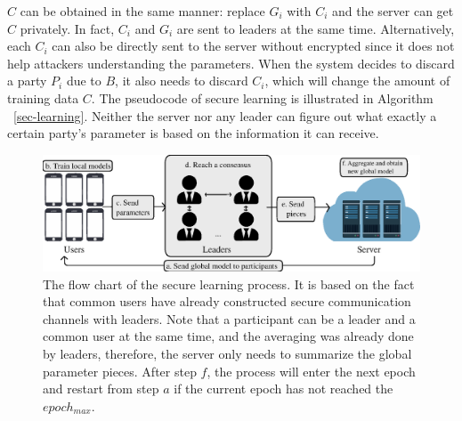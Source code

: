 $C$ can be obtained in the same manner: replace $G_i$ with $C_i$ and the server can get $C$ privately. In fact, $C_i$ and $G_i$ are sent to leaders at the same time. Alternatively, each $C_i$ can also be directly sent to the server without encrypted since it does not help attackers understanding the parameters. When the system decides to discard a party $P_i$ due to $B$, it also needs to discard $C_i$, which will change the amount of training data $C$. The pseudocode of secure learning is illustrated in Algorithm ~\ref{sec-learning}. Neither the server nor any leader can figure out what exactly a certain party's parameter is based on the information it can receive. 

\begin{figure}[!ht]
    \centering
    \includegraphics[width=1.8\columnwidth]{img/alg.eps}
    \caption{The flow chart of the secure learning process. It is based on the fact that common users have already constructed secure communication channels with leaders. Note that a participant can be a leader and a common user at the same time, and the averaging was already done by leaders, therefore, the server only needs to summarize the global parameter pieces. After step $f$, the process will enter the next epoch and restart from step $a$ if the current epoch has not reached the $epoch_{max}$.}
    \label{fig-alg}
\end{figure}

